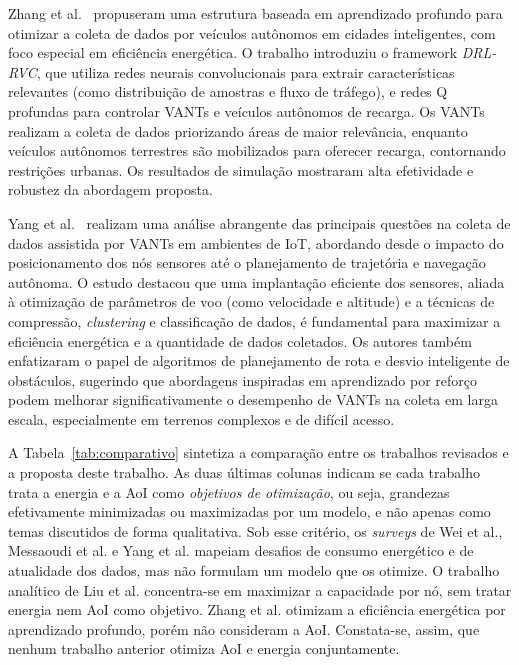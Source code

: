 Zhang et al.~\cite{zhang2018drlrvc} propuseram uma estrutura baseada em aprendizado profundo para otimizar a coleta de dados por veículos autônomos em cidades inteligentes, com foco especial em eficiência energética. O trabalho introduziu o framework \textit{DRL-RVC}, que utiliza redes neurais convolucionais para extrair características relevantes (como distribuição de amostras e fluxo de tráfego), e redes Q profundas para controlar VANTs e veículos autônomos de recarga. Os VANTs realizam a coleta de dados priorizando áreas de maior relevância, enquanto veículos autônomos terrestres são mobilizados para oferecer recarga, contornando restrições urbanas. Os resultados de simulação mostraram alta efetividade e robustez da abordagem proposta.

Yang et al.~\cite{yang2020surveyUAVIoT} realizam uma análise abrangente das principais questões na coleta de dados assistida por VANTs em ambientes de IoT, abordando desde o impacto do posicionamento dos nós sensores até o planejamento de trajetória e navegação autônoma. O estudo destacou que uma implantação eficiente dos sensores, aliada à otimização de parâmetros de voo (como velocidade e altitude) e a técnicas de compressão, \textit{clustering} e classificação de dados, é fundamental para maximizar a eficiência energética e a quantidade de dados coletados. Os autores também enfatizaram o papel de algoritmos de planejamento de rota e desvio inteligente de obstáculos, sugerindo que abordagens inspiradas em aprendizado por reforço podem melhorar significativamente o desempenho de VANTs na coleta em larga escala, especialmente em terrenos complexos e de difícil acesso.

A Tabela~\ref{tab:comparativo} sintetiza a comparação entre os trabalhos revisados e a proposta deste trabalho. As duas últimas colunas indicam se cada trabalho trata a energia e a AoI como \emph{objetivos de otimização}, ou seja, grandezas efetivamente minimizadas ou maximizadas por um modelo, e não apenas como temas discutidos de forma qualitativa. Sob esse critério, os \textit{surveys} de Wei et al., Messaoudi et al. e Yang et al. mapeiam desafios de consumo energético e de atualidade dos dados, mas não formulam um modelo que os otimize. O trabalho analítico de Liu et al. concentra-se em maximizar a capacidade por nó, sem tratar energia nem AoI como objetivo. Zhang et al. otimizam a eficiência energética por aprendizado profundo, porém não consideram a AoI. Constata-se, assim, que nenhum trabalho anterior otimiza AoI e energia conjuntamente.


